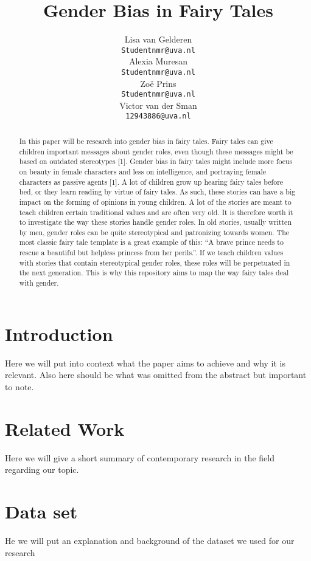 \documentclass[11pt]{article}
\title{Gender Bias in Fairy Tales}
\author{
    Lisa van Gelderen \\
  {\tt Studentnmr@uva.nl} \\\And
    Alexia Muresan \\
  {\tt Studentnmr@uva.nl} \\\And
    Zoë Prins \\
  {\tt Studentnmr@uva.nl} \\
    Victor van der Sman \\
  {\tt 12943886@uva.nl} \\}
\date{}
\begin{document}
\maketitle
\begin{abstract}
  In this paper will be research into  gender bias in fairy tales. Fairy tales can give children important messages about gender roles, even though these messages might be based on outdated stereotypes [1]. Gender bias in fairy tales might include more focus on beauty in female characters and less on intelligence, and portraying female characters as passive agents [1]. A lot of children grow up hearing fairy tales before bed, or they learn reading by virtue of fairy tales. As such, these stories can have a big impact on the forming of opinions in young children. A lot of the stories are meant to teach children certain traditional values and are often very old. It is therefore worth it to investigate the way these stories handle gender roles. In old stories, usually written by men, gender roles can be quite stereotypical and patronizing towards women. The most classic fairy tale template is a great example of this: “A brave prince needs to rescue a beautiful but helpless princess from her perils.”. If we teach children values with stories that contain stereotypical gender roles, these roles will be perpetuated in the next generation. This is why this repository aims to map the way fairy tales deal with gender.
\end{abstract}


\section{Introduction}

Here we will put into context what the paper aims to achieve and why it is relevant. Also here should be what was omitted from the abstract but important to note. 

\section{Related Work}

Here we will give a short summary of contemporary research in the field regarding our topic.

\section{Data set}

He we will put an explanation and background of the dataset we used for our research
\end{document}
